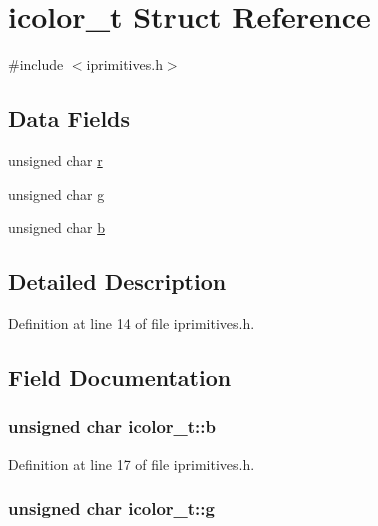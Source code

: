 \hypertarget{structicolor__t}{\section{icolor\-\_\-t Struct Reference}
\label{structicolor__t}
}


{\ttfamily \#include $<$iprimitives.\-h$>$}

\subsection*{Data Fields}
\begin{DoxyCompactItemize}
\item 
unsigned char \hyperlink{structicolor__t_af41be99aa200064979c76e29d00d4aff}{r}
\item 
unsigned char \hyperlink{structicolor__t_a3cf0a9335bbc32fc211d22f3ef502110}{g}
\item 
unsigned char \hyperlink{structicolor__t_acb75f6cdb4866b33921bde0c5f9000ce}{b}
\end{DoxyCompactItemize}


\subsection{Detailed Description}


Definition at line 14 of file iprimitives.\-h.



\subsection{Field Documentation}
\hypertarget{structicolor__t_acb75f6cdb4866b33921bde0c5f9000ce}{
\subsubsection[{b}]{\setlength{\rightskip}{0pt plus 5cm}unsigned char icolor\-\_\-t\-::b}}\label{structicolor__t_acb75f6cdb4866b33921bde0c5f9000ce}


Definition at line 17 of file iprimitives.\-h.

\hypertarget{structicolor__t_a3cf0a9335bbc32fc211d22f3ef502110}{
\subsubsection[{g}]{\setlength{\rightskip}{0pt plus 5cm}unsigned char icolor\-\_\-t\-::g}}\label{structicolor__t_a3cf0a9335bbc32fc211d22f3ef502110}


